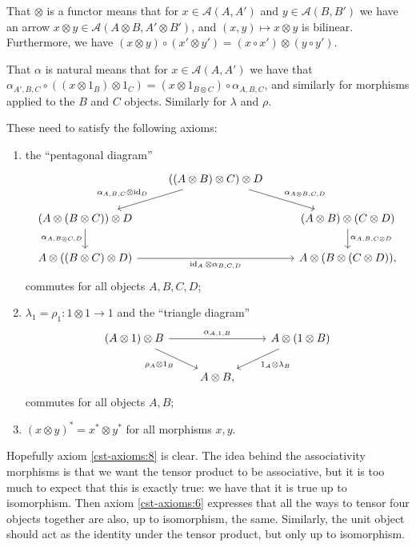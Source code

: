 \documentclass[a4paper,11pt]{article}
\theoremstyle{plain}
\theoremstyle{remark}
\newcommand{\mc}[1]{\mathcal{#1}}
\newcommand{\id}{\operatorname{id}}
\begin{document}
That $\otimes$ is a functor means that for $x\in\mc A(A,A')$ and $y\in\mc A(B,B')$ we have an arrow $x\otimes y \in \mc A(A\otimes B, A'\otimes B')$, and $(x,y) \mapsto x\otimes y$ is bilinear.  Furthermore, we have $(x\otimes y)\circ (x'\otimes y') = (x\circ x') \otimes (y\circ y')$.

That $\alpha$ is natural means that for $x\in\mc A(A,A')$ we have that $\alpha_{A',B,C} \circ ((x\otimes 1_B)\otimes 1_C) = (x\otimes 1_{B\otimes C})\circ \alpha_{A,B,C}$, and similarly for morphisms applied to the $B$ and $C$ objects.  Similarly for $\lambda$ and $\rho$.

These need to satisfy the following axioms:
\begin{enumerate}[(1), start=6]
  \item\label{cst-axioms:6} the ``pentagonal diagram''
  \[ \begin{tikzcd}
    & ((A\otimes B)\otimes C) \otimes D \ar[ld, "\alpha_{A,B,C}\otimes\id_D"']   \ar[rd, "\alpha_{A\otimes B,C,D}"] \\
    (A\otimes (B\otimes C))\otimes D \ar[d, "\alpha_{A,B\otimes C,D}"'] && (A\otimes B) \otimes (C\otimes D) \ar[d, "\alpha_{A,B,C\otimes D}"] \\
    A \otimes ((B\otimes C)\otimes D) \ar[rr, "\id_A\otimes\alpha_{B,C,D}"'] && A \otimes (B\otimes(C\otimes D)),
  \end{tikzcd} \]
  commutes for all objects $A,B,C,D$;
  \item\label{cst-axioms:7} $\lambda_1 = \rho_1 \colon 1\otimes 1\to 1$ and the ``triangle diagram''
  \[ \begin{tikzcd}
    (A\otimes 1)\otimes B \ar[rr, "\alpha_{A,1,B}"] \ar[rd, "\rho_A\otimes 1_B"'] && A\otimes (1\otimes B) \ar[ld, "1_A\otimes \lambda_B"] \\
    &   A\otimes B,
  \end{tikzcd} \]
  commutes for all objects $A,B$;
  \item\label{cst-axioms:8} $(x\otimes y)^* = x^* \otimes y^*$ for all morphisms $x,y$.
\end{enumerate}

Hopefully axiom \ref{cst-axioms:8} is clear.  The idea behind the associativity morphisms is that we want the tensor product to be associative, but it is too much to expect that this is exactly true: we have that it is true up to isomorphism.  Then axiom \ref{cst-axioms:6} expresses that all the ways to tensor four objects together are also, up to isomorphism, the same.  Similarly, the unit object should act as the identity under the tensor product, but only up to isomorphism.
\end{document}
